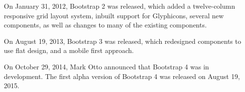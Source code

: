 On January 31, 2012, Bootstrap 2 was released, which added a twelve-column responsive grid layout system, inbuilt support for Glyphicons, several new components, as well as changes to many of the existing components.
\newline

On August 19, 2013, Bootstrap 3 was released, which redesigned components to use flat design, and a mobile first approach.
\newline

On October 29, 2014, Mark Otto announced that Bootstrap 4 was in development. The first alpha version of Bootstrap 4 was released on August 19, 2015.
%

%

